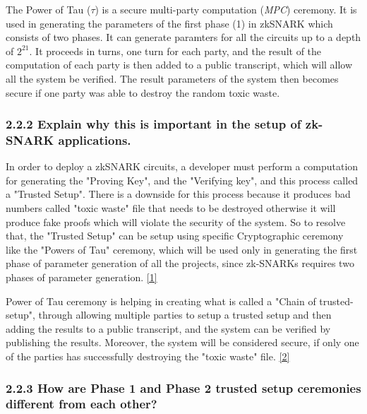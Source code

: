 \documentclass[letterpaper, 10 pt, conference]{ieeeconf}  %
\begin{document}
The Power of Tau ($\tau$) is a secure multi-party computation (\textit{MPC}) ceremony. It is used in generating the parameters of the first phase (1) in zkSNARK which consists of two phases. It can generate paramters for all the circuits up to a depth of $2^{21}$. 
It proceeds in turns, one turn for each party, and the result of the computation of each party is then added to a public transcript, which will allow all the system be verified. The result parameters of the system then becomes secure if one party was able to destroy the random toxic waste. 

\subsubsection{\textbf{2.2.2 Explain why this is important in the setup of zk-SNARK applications.}}


In order to deploy a zkSNARK circuits, a developer must perform a computation for generating the "Proving Key", and the "Verifying key", and this process called a "Trusted Setup". There is a downside for this process because it produces bad numbers called "toxic waste" file that needs to be destroyed otherwise it will produce fake proofs which will violate the security of the system. So to resolve that, the "Trusted Setup" can be setup using specific Cryptographic ceremony like the "Powers of Tau" ceremony, which will be used only in generating the first phase of parameter generation of all the projects, since zk-SNARKs requires two phases of parameter generation. \href{https://medium.com/coinmonks/announcing-the-perpetual-powers-of-tau-ceremony-to-benefit-all-zk-snark-projects-c3da86af8377#:~:text=The%20Powers%20of%20Tau%20ceremony,protocol%20can%20be%20publicly%20verified.&text=Nevertheless%2C%20each%20ceremony%20takes%20time%20and%20is%20tedious%20to%20coordinate.}{[1]}

Power of Tau ceremony is helping in creating what is called a "Chain of trusted-setup", through allowing multiple parties to setup a trusted setup and then adding the results to a public transcript, and the system can be verified by publishing the results. Moreover, the system will be considered secure, if only one of the parties has successfully destroying the "toxic waste" file. \href{https://blog.hermez.io/hermez-zero-knowledge-proofs/}{[2]}


\subsubsection{\textbf{2.2.3 How are Phase 1 and Phase 2 trusted setup ceremonies different from each other?}}
\end{document}
